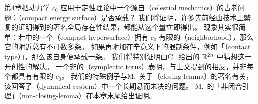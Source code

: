 第4章把动力学\trCapacity{} $c_0$ 应用于\trHamiltonianSystem{}定性理论中一个源自\textbf{\trCelestialMechanics}（celestial mechanics）的古老问题：\textbf{\trCompact\trEnergySurface}（compact energy surface）是否承载\trPeriodicOrbit？
我们将证明，许多先前经由技术上繁复的证明得到的著名全局存在性结果，都能从这个\trInvariant{}量立即得出。
现象其实很简单：若\trSymplecticManifold{}中的一个\textbf{\trCompact\trHypersurface}（compact hypersurface）拥有\trCapacity{} $c_0$ 有限的\textbf{\trNeighborhood}（neighborhood），那么它的附近总有不可数多条\trClosedCharacteristic。
如果再附加在辛意义下\trInvariant{}的限制条件，例如「\textbf{\trContactType}（contact type）」，那么该\trHypersurface{}自身便承载一条\trClosedCharacteristic。
我们将特别证明由C.~\trViterbo{}给出的 $\mathbb{R}^{2n}$ 中\trWeinstein{}猜想这一开创性的解决。
一个非\trStandard{}的\textbf{\trSymplectic\trTorus}（symplectic torus）表明，与上文提到的\trGromovWidth{}相反，并非每个\trCompact\trSymplecticManifold{}都具有有限的\trCapacity{} $c_0$。
我们的特殊例子与M.~\trHerman{}关于\textbf{\trClosingLemma}（closing lemma）的著名\trCounterexample{}有关，该\trCounterexample{}回答了\textbf{\trDynamicalSystem}（dynamical system）中一个长期悬而未决的问题。
M.~\trHerman{}的「非闭合引理」（non-closing-lemma）在本章末尾给出证明。

